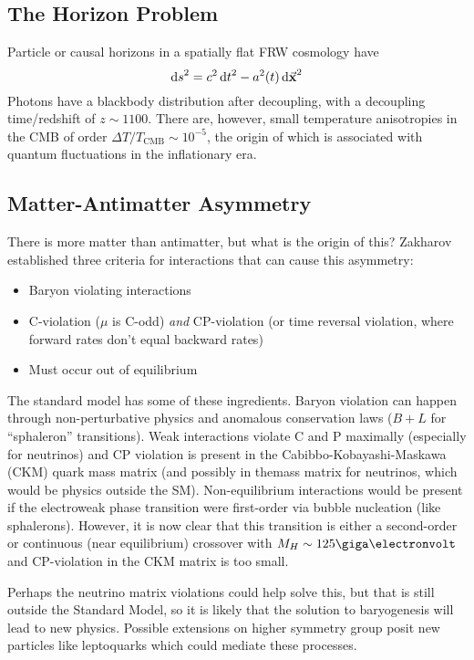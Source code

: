 \documentclass[a4paper,twoside,master.tex]{subfiles}
\begin{document}
\subsection{The Horizon Problem}\label{sub:the_horizon_problem}

Particle or causal horizons in a spatially flat FRW cosmology have
\begin{equation}
    \dd{s}^2 = c^2 \dd{t}^2 - a^2(t) \dd{\va{x}}^2
\end{equation}
Photons have a blackbody distribution after decoupling, with a decoupling time/redshift of $ z \sim 1100 $. There are, however, small temperature anisotropies in the CMB of order $ \Delta T / T_{\text{CMB}} \sim 10^{-5} $, the origin of which is associated with quantum fluctuations in the inflationary era.

\subsection{Matter-Antimatter Asymmetry}\label{sub:matter-antimatter_asymmetry}

There is more matter than antimatter, but what is the origin of this? Zakharov established three criteria for interactions that can cause this asymmetry:
\begin{itemize}
    \item Baryon violating interactions
    \item C-violation ($ \mu $ is C-odd) \textit{and} CP-violation (or time reversal violation, where forward rates don't equal backward rates)
    \item Must occur out of equilibrium
\end{itemize}

The standard model has some of these ingredients. Baryon violation can happen through non-perturbative physics and anomalous conservation laws ($ B+L $ for ``sphaleron'' transitions). Weak interactions violate C and P maximally (especially for neutrinos) and CP violation is present in the Cabibbo-Kobayashi-Maskawa (CKM) quark mass matrix (and possibly in themass matrix for neutrinos, which would be physics outside the SM). Non-equilibrium interactions would be present if the electroweak phase transition were first-order via bubble nucleation (like sphalerons). However, it is now clear that this transition is either a second-order or continuous (near equilibrium) crossover with $ M_{H} \sim 125 \giga\electronvolt $ and CP-violation in the CKM matrix is too small.

Perhaps the neutrino matrix violations could help solve this, but that is still outside the Standard Model, so it is likely that the solution to baryogenesis will lead to new physics. Possible extensions on higher symmetry group posit new particles like leptoquarks which could mediate these processes.
\end{document}
